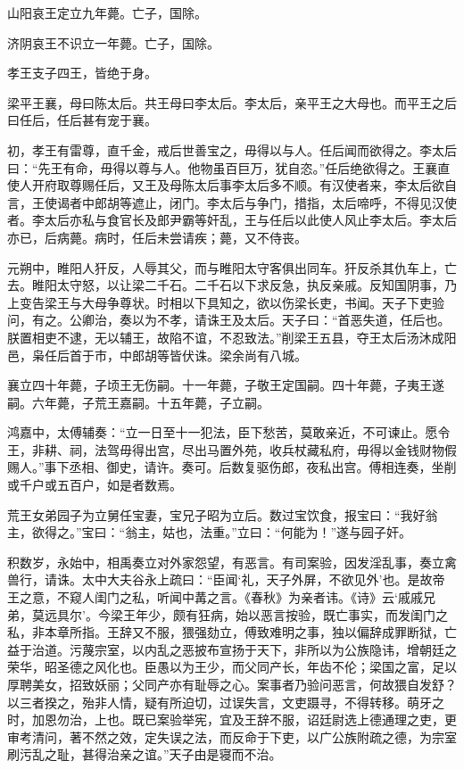 \documentclass[12pt,UTF8]{ctexbook}
\begin{document}
山阳哀王定立九年薨。亡子，国除。



济阴哀王不识立一年薨。亡子，国除。



孝王支子四王，皆绝于身。



梁平王襄，母曰陈太后。共王母曰李太后。李太后，亲平王之大母也。而平王之后曰任后，任后甚有宠于襄。



初，孝王有雷尊，直千金，戒后世善宝之，毋得以与人。任后闻而欲得之。李太后曰：“先王有命，毋得以尊与人。他物虽百巨万，犹自恣。”任后绝欲得之。王襄直使人开府取尊赐任后，又王及母陈太后事李太后多不顺。有汉使者来，李太后欲自言，王使谒者中郎胡等遮止，闭门。李太后与争门，措指，太后啼呼，不得见汉使者。李太后亦私与食官长及郎尹霸等奸乱，王与任后以此使人风止李太后。李太后亦已，后病薨。病时，任后未尝请疾；薨，又不侍丧。



元朔中，睢阳人犴反，人辱其父，而与睢阳太守客俱出同车。犴反杀其仇车上，亡去。睢阳太守怒，以让梁二千石。二千石以下求反急，执反亲戚。反知国阴事，乃上变告梁王与大母争尊状。时相以下具知之，欲以伤梁长吏，书闻。天子下吏验问，有之。公卿治，奏以为不孝，请诛王及太后。天子曰：“首恶失道，任后也。朕置相吏不逮，无以辅王，故陷不谊，不忍致法。”削梁王五县，夺王太后汤沐成阳邑，枭任后首于市，中郎胡等皆伏诛。梁余尚有八城。



襄立四十年薨，子顷王无伤嗣。十一年薨，子敬王定国嗣。四十年薨，子夷王遂嗣。六年薨，子荒王嘉嗣。十五年薨，子立嗣。



鸿嘉中，太傅辅奏：“立一日至十一犯法，臣下愁苦，莫敢亲近，不可谏止。愿令王，非耕、祠，法驾毋得出宫，尽出马置外苑，收兵杖藏私府，毋得以金钱财物假赐人。”事下丞相、御史，请许。奏可。后数复驱伤郎，夜私出宫。傅相连奏，坐削或千户或五百户，如是者数焉。



荒王女弟园子为立舅任宝妻，宝兄子昭为立后。数过宝饮食，报宝曰：“我好翁主，欲得之。”宝曰：“翁主，姑也，法重。”立曰：“何能为！”遂与园子奸。



积数岁，永始中，相禹奏立对外家怨望，有恶言。有司案验，因发淫乱事，奏立禽兽行，请诛。太中大夫谷永上疏曰：“臣闻‘礼，天子外屏，不欲见外’也。是故帝王之意，不窥人闺门之私，听闻中冓之言。《春秋》为亲者讳。《诗》云‘戚戚兄弟，莫远具尔’。今梁王年少，颇有狂病，始以恶言按验，既亡事实，而发闺门之私，非本章所指。王辞又不服，猥强劾立，傅致难明之事，独以偏辞成罪断狱，亡益于治道。污蔑宗室，以内乱之恶披布宣扬于天下，非所以为公族隐讳，增朝廷之荣华，昭圣德之风化也。臣愚以为王少，而父同产长，年齿不伦；梁国之富，足以厚聘美女，招致妖丽；父同产亦有耻辱之心。案事者乃验问恶言，何故猥自发舒？以三者揆之，殆非人情，疑有所迫切，过误失言，文吏蹑寻，不得转移。萌牙之时，加恩勿治，上也。既已案验举宪，宜及王辞不服，诏廷尉选上德通理之吏，更审考清问，著不然之效，定失误之法，而反命于下吏，以广公族附疏之德，为宗室刷污乱之耻，甚得治亲之谊。”天子由是寝而不治。
\end{document}
